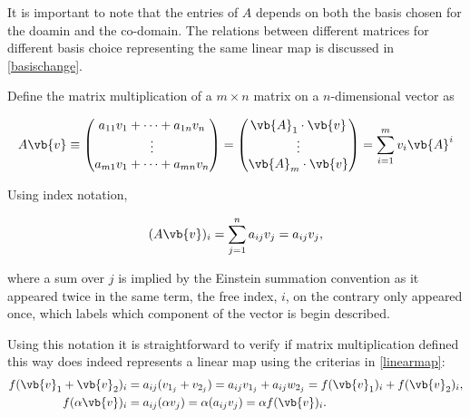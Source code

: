\documentclass[a4paper,12pt]{report}
\begin{document}
It is important to note that the entries of \(A\) depends on both the basis chosen for the doamin and the co-domain. The relations between different matrices for different basis choice representing the same linear map is discussed in \cref{basischange}.  

Define the matrix multiplication of a \(m \times  n\) matrix on a \(n\)-dimensional vector as   

\begin{equation}\label{matrixmultiplication} 
     A\vb{v} \equiv \begin{pmatrix}
         a_{11}v_{1} + \cdots + a_{1n}v_{n}    \\
        \vdots   \\
        a_{m1}v_{1} + \cdots + a_{mn}v_{n}    \\
    \end{pmatrix} = \begin{pmatrix}
         \vb{A} _{1} \cdot \vb{v}  \\
        \vdots   \\
        \vb{A} _{m} \cdot \vb{v}   \\
    \end{pmatrix} =  \sum_{i=1}^{m} v_{i} \vb{A} ^{i}    
\end{equation}

Using index notation,

\begin{equation}\label{matmul} 
    (A\vb{v} )_{i} =  \sum_{j=1}^{n} a_{ij} v_{j} = a_{ij} v_{j}, 
\end{equation}

where a sum over \(j\) is implied by the Einstein summation convention as it appeared twice in the same term, the free index, \(i\), on the contrary only appeared once, which labels which component of the vector is begin described.

Using this notation it is straightforward to verify if matrix multiplication defined this way does indeed represents a linear map using the criterias in \cref{linearmap}:
\begin{equation}
    \begin{aligned}
    f(\vb{v}_{1}  + \vb{v}_{2}  )_{i} &= a_{ij}(v_{1_j} + v_{2_j} ) = a_{ij}v_{1_j} + a_{ij}w_{2_j}= f(\vb{v}_{1}  )_{i} + f(\vb{v}_{2}  )_{i}, \\      
    f(\alpha \vb{v} )_{i} &= a_{ij} (\alpha v_{j} ) = \alpha (a_{ij}v_{j}  ) = \alpha f(\vb{v} )_{i} . 
    \end{aligned}
\end{equation}
\end{document}
